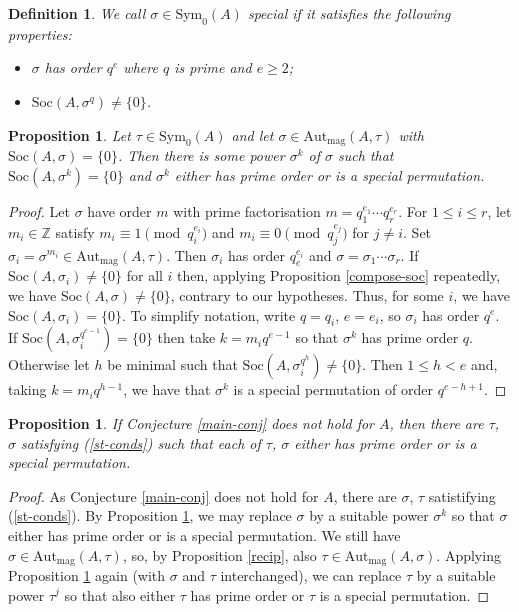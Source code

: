 \documentclass[letterpaper,12pt]{amsart}
\numberwithin{equation}{section}
\numberwithin{algorithm}{section}
\newtheorem{proposition}[lemma]{Proposition}
\newtheorem{definition}[lemma]{Definition}
\theoremstyle{definition}
\newcommand{\Z}{\mathbb{Z}}
\newcommand{\Soc}{\mathrm{Soc}}
\newcommand{\Autmag}{\mathrm{Aut}_\mathrm{mag}}
\newcommand{\Symo}{\mathrm{Sym}_0}
\begin{document}
\begin{definition}
We call $\sigma \in \Symo(A)$ {\em special} if it satisfies the following properties:
\begin{itemize}
	\item[(i)] $\sigma$ has order $q^e$ where $q$ is prime and $e \geq 2$; 
	\item[(ii)] $\Soc(A,\sigma^q) \neq \{0\}$.
\end{itemize}
\end{definition}

\begin{proposition} \label{reduce-to-pp}
Let $\tau \in \Symo(A)$ and let $\sigma \in \Autmag(A,\tau)$ with $\Soc(A,\sigma)=\{0\}$. Then there is some power $\sigma^k$ of $\sigma$ such that $\Soc(A,\sigma^k)=\{0\}$ and $\sigma^k$ either has prime order or is a special permutation.
\end{proposition}
\begin{proof} 
Let $\sigma$ have order $m$ with prime factorisation $m=q_1^{e_1} \cdots q_r^{e_r}$. For $1 \leq i \leq r$, let $m_i \in \Z$ satisfy  $m_i \equiv 1 \pmod{q_i^{e_i}}$ and $m_i \equiv 0 \pmod{q_j^{e_j}}$ for $j \neq i$. Set $\sigma_i = \sigma^{m_i} \in \Autmag(A,\tau)$. Then $\sigma_i$ has order $q_e^{e_i}$ and $\sigma=\sigma_1 \cdots \sigma_r$. If $\Soc(A,\sigma_i) \neq \{0\}$ for all $i$ then, applying Proposition \ref{compose-soc} repeatedly, we have $\Soc(A,\sigma) \neq \{0\}$, contrary to our hypotheses. Thus, for some $i$, we have $\Soc(A,\sigma_i)=\{0\}$. To simplify notation, write $q=q_i$, $e=e_i$, so $\sigma_i$ has order $q^e$. If $\Soc(A,\sigma_i^{q^{e-1}})=\{0\}$ then take $k=m_i q^{e-1}$ so that $\sigma^k$ has prime order $q$. Otherwise let $h$ be minimal such that $\Soc(A,\sigma_i^{q^h})\neq \{0\}$. Then $1 \leq h <e$ and, taking $k=m_i q^{h-1}$, we have that $\sigma^k$ is a special permutation of order $q^{e-h+1}$. 
\end{proof}

\begin{proposition} \label{prime-special}
If Conjecture \ref{main-conj} does not hold for $A$, then there are $\tau$, $\sigma$ satisfying (\ref{st-conds}) such that each of $\tau$, $\sigma$ either has prime order or is a special permutation.
\end{proposition}
\begin{proof}
As Conjecture \ref{main-conj} does not hold for $A$, there are $\sigma$, $\tau$ satistifying (\ref{st-conds}).
By Proposition \ref{reduce-to-pp}, we may replace $\sigma$ by a suitable power $\sigma^k$ so that $\sigma$ either has prime order or is a special permutation. We still have $\sigma \in \Autmag(A,\tau)$, so, by Proposition \ref{recip}, also $\tau \in \Autmag(A,\sigma)$. Applying Proposition \ref{reduce-to-pp} again (with $\sigma$ and $\tau$ interchanged), we can replace $\tau$ by a suitable power $\tau^j$ so that also either $\tau$ has prime order or $\tau$ is a special permutation.
\end{proof}
\end{document}
